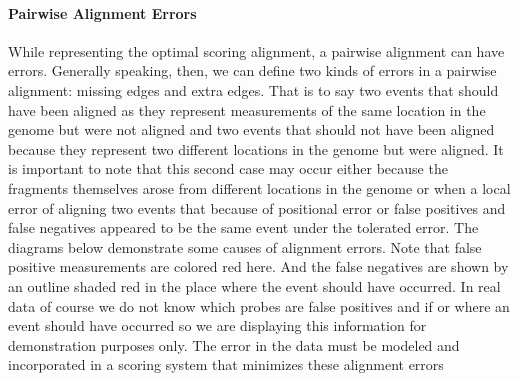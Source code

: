 \documentclass[11pt]{article}
\begin{document}
\paragraph{Pairwise Alignment Errors\newline}
\par{
While representing the optimal scoring alignment, a pairwise alignment can have errors.  Generally speaking, then, we can define two kinds of errors in a pairwise alignment: missing edges and extra edges.  That is to say two events that should have been aligned as they represent measurements of the same location in the genome but were not aligned and two events that should not have been aligned because they represent two different locations in the genome but were aligned.  It is important to note that this second case may occur either because the fragments themselves arose from different locations in the genome or when a local error of aligning two events that because of positional error or false positives and false negatives appeared to be the same event under the tolerated error.  The diagrams below demonstrate some causes of alignment errors.  Note that false positive measurements are colored red here.  And the false negatives are shown by an outline shaded red in the place where the event should have occurred.  In real data of course we do not know which probes are false positives and if or where an event should have occurred so we are displaying this information for demonstration purposes only. The error in the data must be modeled and incorporated in a scoring system that minimizes these alignment errors \cite{Sarkar}\cite{Nguyen}
}
\end{document}
